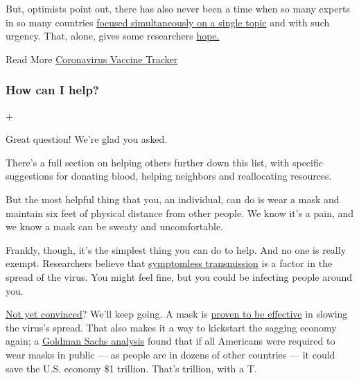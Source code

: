 But, optimists point out, there has also never been a time when so many
experts in so many countries
\href{https://www.nytimes3xbfgragh.onion/2020/04/01/world/europe/coronavirus-science-research-cooperation.html}{focused
simultaneously on a single topic} and with such urgency. That, alone,
gives some researchers
\href{https://www.nytimes3xbfgragh.onion/2020/05/20/health/coronavirus-vaccines.html}{hope.}

 Read More
\href{https://www.nytimes3xbfgragh.onion/interactive/2020/science/coronavirus-vaccine-tracker.html}{Coronavirus
Vaccine Tracker}

\hypertarget{how-can-i-help}{%
\subsubsection{How can I help?}\label{how-can-i-help}}

+

Great question! We're glad you asked.

There's a full section on helping others further down this list, with
specific suggestions for donating blood, helping neighbors and
reallocating resources.

But the most helpful thing that you, an individual, can do is wear a
mask and maintain six feet of physical distance from other people. We
know it's a pain, and we know a mask can be sweaty and uncomfortable.

Frankly, though, it's the simplest thing you can do to help. And no one
is really exempt. Researchers believe that
\href{https://www.nytimes3xbfgragh.onion/2020/06/27/world/europe/coronavirus-spread-asymptomatic.html}{symptomless
transmission} is a factor in the spread of the virus. You might feel
fine, but you could be infecting people around you.

\href{https://www.nytimes3xbfgragh.onion/2020/06/02/health/coronavirus-face-masks-surveys.html}{Not
yet convinced}? We'll keep going. A mask is
\href{https://www.cdc.gov/coronavirus/2019-ncov/prevent-getting-sick/cloth-face-cover-guidance.html}{proven
to be effective} in slowing the virus's spread. That also makes it a way
to kickstart the sagging economy again; a
\href{https://www.forbes.com/sites/sarahhansen/2020/06/30/a-national-mask-mandate-could-save-the-us-economy-1-trillion-goldman-sachs-says/\#1083f1e56f18}{Goldman
Sachs analysis} found that if all Americans were required to wear masks
in public --- as people are in dozens of other countries --- it could
save the U.S. economy \$1 trillion. That's trillion, with a T.


